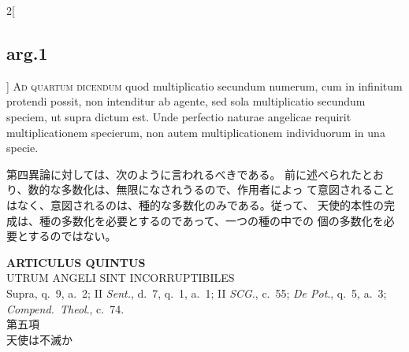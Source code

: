 \documentclass[paper=a4paper,fontsize=10pt,jafontsize=9pt,titlepage]{jlreq}
\begin{document}
\begin{paracol}{2}[\subsection{arg.1}]
{\scshape Ad quartum dicendum} quod multiplicatio
secundum numerum, cum in infinitum protendi possit, non intenditur ab
agente, sed sola multiplicatio secundum speciem, ut supra dictum
est. Unde perfectio naturae angelicae requirit multiplicationem
specierum, non autem multiplicationem individuorum in una specie.

\switchcolumn

第四異論に対しては、次のように言われるべきである。
前に述べられたとおり、数的な多数化は、無限になされうるので、作用者によっ
 て意図されることはなく、意図されるのは、種的な多数化のみである。従って、
 天使的本性の完成は、種の多数化を必要とするのであって、一つの種の中での
 個の多数化を必要とするのではない。

\end{paracol}

\newpage

{}
\setcounter{section}{5}
\setcounter{subsection}{0}
\begin{center}
 {\Large {\bfseries ARTICULUS QUINTUS}}\\
 {\large UTRUM ANGELI SINT INCORRUPTIBILES}\\
 {\footnotesize Supra, q.~9, a.~2; II {\itshape Sent.}, d.~7, q.~1,
 a.~1; II {\itshape SCG}., c.~55; {\itshape De Pot}., q.~5, a.~3;
 {\itshape Compend.~Theol}., c.~74.}\\
 {\Large 第五項\\天使は不滅か}
\end{center}
\end{document}

